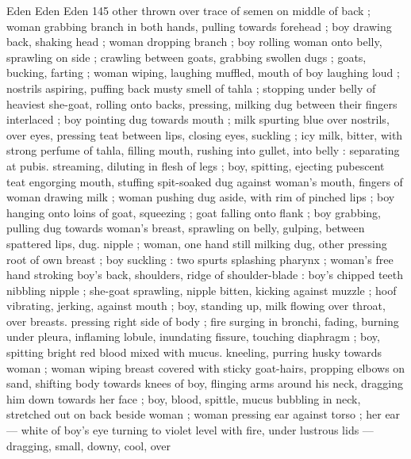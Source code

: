 Eden Eden Eden 145
other thrown over trace of semen on middle of back ; woman
grabbing branch in both hands, pulling towards forehead ; boy
drawing back, shaking head ; woman dropping branch ; boy rolling
woman onto belly, sprawling on side ; crawling between goats,
grabbing swollen dugs ; goats, bucking, farting ; woman wiping,
laughing muffled, mouth of boy laughing loud ; nostrils aspiring,
puffing back musty smell of tahla ; stopping under belly of heaviest
she-goat, rolling onto backs, pressing, milking dug between their
fingers interlaced ; boy pointing dug towards mouth ; milk spurting
blue over nostrils, over eyes, pressing teat between lips, closing
eyes, suckling ; icy milk, bitter, with strong perfume of tahla, filling
mouth, rushing into gullet, into belly : separating at pubis.
streaming, diluting in flesh of legs ; boy, spitting, ejecting pubescent
teat engorging mouth, stuffing spit-soaked dug against woman's
mouth, fingers of woman drawing milk ; woman pushing dug aside,
with rim of pinched lips ; boy hanging onto loins of goat, squeezing
; goat falling onto flank ; boy grabbing, pulling dug towards woman's
breast, sprawling on belly, gulping, between spattered lips, dug.
nipple ; woman, one hand still milking dug, other pressing root of
own breast ; boy suckling : two spurts splashing pharynx ; woman's
free hand stroking boy's back, shoulders, ridge of shoulder-blade :
boy's chipped teeth nibbling nipple ; she-goat sprawling, nipple
bitten, kicking against muzzle ; hoof vibrating, jerking, against
mouth ; boy, standing up, milk flowing over throat, over breasts.
pressing right side of body ; fire surging in bronchi, fading, burning
under pleura, inflaming lobule, inundating fissure, touching
diaphragm ; boy, spitting bright red blood mixed with mucus.
kneeling, purring husky towards woman ; woman wiping breast
covered with sticky goat-hairs, propping elbows on sand, shifting
body towards knees of boy, flinging arms around his neck, dragging
him down towards her face ; boy, blood, spittle, mucus bubbling in
neck, stretched out on back beside woman ; woman pressing ear
against torso ; her ear — white of boy's eye turning to violet level
with fire, under lustrous lids — dragging, small, downy, cool, over

